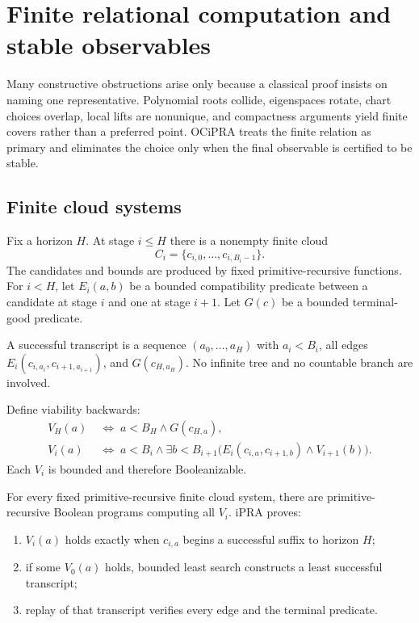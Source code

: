 \section{Finite relational computation and stable observables}

Many constructive obstructions arise only because a classical proof insists on naming one representative.  Polynomial roots collide, eigenspaces rotate, chart choices overlap, local lifts are nonunique, and compactness arguments yield finite covers rather than a preferred point.  OCiPRA treats the finite relation as primary and eliminates the choice only when the final observable is certified to be stable.

\subsection{Finite cloud systems}

Fix a horizon $H$.  At stage $i\leq H$ there is a nonempty finite cloud
\[
 C_i=\{c_{i,0},\ldots,c_{i,B_i-1}\}.
\]
The candidates and bounds are produced by fixed primitive-recursive functions.  For $i<H$, let
$E_i(a,b)$ be a bounded compatibility predicate between a candidate at stage $i$ and one at stage $i+1$.  Let $G(c)$ be a bounded terminal-good predicate.

A successful transcript is a sequence
$(a_0,\ldots,a_H)$ with $a_i<B_i$, all edges
$E_i(c_{i,a_i},c_{i+1,a_{i+1}})$, and $G(c_{H,a_H})$.
No infinite tree and no countable branch are involved.

Define viability backwards:
\[
\begin{aligned}
 V_H(a)&\;\Longleftrightarrow\;a<B_H\wedge G(c_{H,a}),\\
 V_i(a)&\;\Longleftrightarrow\;a<B_i\wedge
   \exists b<B_{i+1}\bigl(E_i(c_{i,a},c_{i+1,b})\wedge V_{i+1}(b)\bigr).
\end{aligned}
\]
Each $V_i$ is bounded and therefore Booleanizable.

\begin{theorem}\label{thm:viability}
For every fixed primitive-recursive finite cloud system, there are primitive-recursive Boolean programs computing all $V_i$.  iPRA proves:

\begin{enumerate}
  \item $V_i(a)$ holds exactly when $c_{i,a}$ begins a successful suffix to horizon $H$;
  \item if some $V_0(a)$ holds, bounded least search constructs a least successful transcript;
  \item replay of that transcript verifies every edge and the terminal predicate.
\end{enumerate}
\end{theorem}

